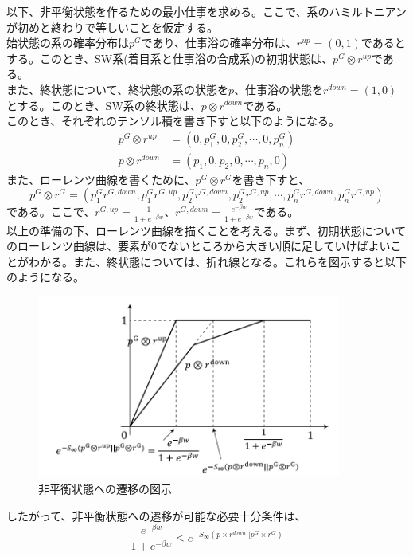 \documentclass[a4paper,11pt]{jsarticle}
\numberwithin{equation}{section}
\begin{document}
以下、非平衡状態を作るための最小仕事を求める。ここで、系のハミルトニアンが初めと終わりで等しいことを仮定する。\\
始状態の系の確率分布は$p^G$であり、仕事浴の確率分布は、$r^{up} = (0,1)$であるとする。このとき、SW系(着目系と仕事浴の合成系)の初期状態は、$p^G \otimes r^{up}$である。\\
また、終状態について、終状態の系の状態を$p$、仕事浴の状態を$r^{down} = (1,0)$とする。このとき、SW系の終状態は、$p \otimes r^{down}$である。\\
このとき、それぞれのテンソル積を書き下すと以下のようになる。
\begin{align}
    p^G \otimes r^{up} &= (0,p_1^G,0,p_2^G,\cdots,0,p_n ^G)\\
    p \otimes r^{down} &= (p_1,0,p_2,0,\cdots,p_n,0)
\end{align}
また、ローレンツ曲線を書くために、$p^G \otimes r^G$を書き下すと、
\begin{equation}
    p^G \otimes r^G = (p_1^G r^{G,down},p_1^G r^{G,up},p_2^G r^{G,down},p_2^G r^{G,up},\cdots,p_n^G r^{G,down},p_n^G r^{G,up})
\end{equation}
である。ここで、$r^{G,up} = \frac{1}{1+e^{-\beta w}}$、$r^{G,down} = \frac{e^{-\beta w}}{1+e^{-\beta w}}$である。\\
以上の準備の下、ローレンツ曲線を描くことを考える。まず、初期状態についてのローレンツ曲線は、要素が0でないところから大きい順に足していけばよいことがわかる。また、終状態については、折れ線となる。これらを図示すると以下のようになる。
\begin{figure}[H]
    \begin{center}
    \includegraphics[width=100mm]{image5.png}
    \end{center}
    \caption{非平衡状態への遷移の図示}
    \label{fig:five}
\end{figure}
したがって、非平衡状態への遷移が可能な必要十分条件は、
\begin{equation}
    \frac{e^{-\beta w}}{1+e^{-\beta w}} \leq e^{-S_{\infty} (p\times r^{down}||p^G \times r^G)}
\end{equation}
\end{document}
